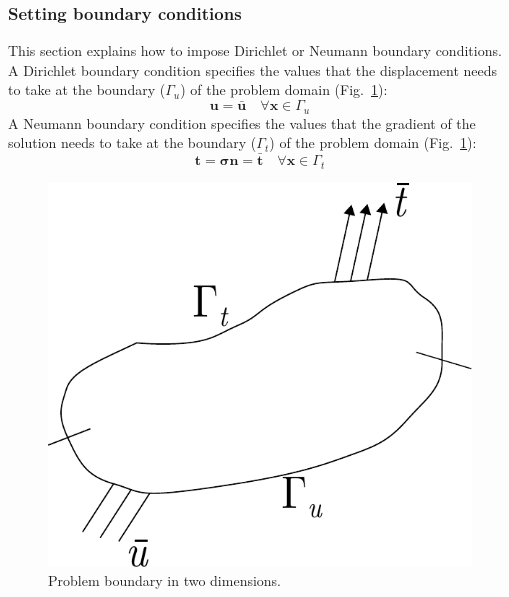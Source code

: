 \documentclass[a4paper,11pt]{book}
\renewcommand{\vec}[1]{\ensuremath{\boldsymbol{#1}}}
\newcommand{\mat}[1]{\ensuremath{\boldsymbol{#1}}}
\begin{document}
\subsubsection{Setting boundary conditions\label{sect:smm:boundary}}
This section explains how to  impose Dirichlet or Neumann boundary conditions. A
Dirichlet boundary condition specifies the values that the displacement needs to
take    at    the    boundary     ($\Gamma_u$)    of    the    problem    domain
(Fig.~\ref{fig:smm:boundaries}):
\begin{equation}
  \vec{u} = \vec{\bar u} \quad \forall \vec{x}\in \Gamma_{u}
\end{equation}
A  Neumann boundary  condition specifies  the values  that the  gradient  of the
solution  needs to  take  at the  boundary  ($\Gamma_t$) of  the problem  domain
(Fig.~\ref{fig:smm:boundaries}):
\begin{equation}
  \vec{t} = \mat{\sigma} \vec{n} = \vec{\bar t} \quad \forall \vec{x}\in \Gamma_{t}
\end{equation}
\begin{figure}[!htb]
  \centering
  \includegraphics[scale=0.6]{figures/boundary}
  \caption{Problem boundary in two dimensions.\label{fig:smm:boundaries}}
\end{figure}
\end{document}
